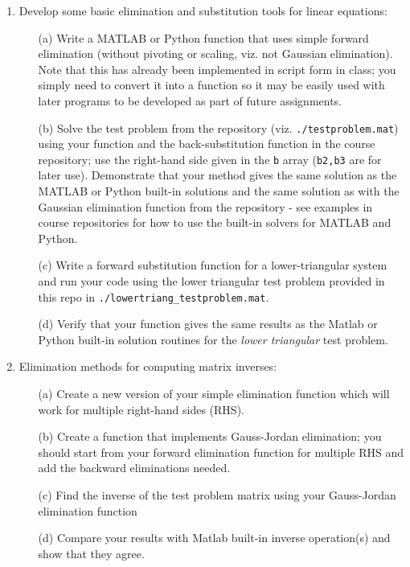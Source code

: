 \documentclass{article}
\begin{document}
\begin{enumerate}
  \item Develop some basic elimination and substitution tools for linear equations:   
  \begin{itemize}
    \item[(a)] Write a MATLAB or Python function that uses simple forward elimination (without pivoting or scaling, viz. not Gaussian elimination).  Note that this has already been implemented in script form in class; you simply need to convert it into a function so it may be easily used with later programs to be developed as part of future assignments.  
    \item[(b)] Solve the test problem from the repository (viz. \texttt{./testproblem.mat}) using your function and the back-substitution function in the course repository; use the right-hand side given in the \texttt{b} array (\texttt{b2,b3} are for later use).   Demonstrate that your method gives the same solution as the MATLAB or Python built-in solutions and the same solution as with the Gaussian elimination function from the repository - see examples in course repositories for how to use the built-in solvers for MATLAB and Python. 
    \item[(c)] Write a forward substitution function for a lower-triangular system and run your code using the lower triangular test problem provided in this repo in \texttt{./lowertriang\_testproblem.mat}.  
    \item[(d)] Verify that your function gives the same results as the Matlab or Python built-in solution routines for the \emph{lower triangular} test problem.  
  \end{itemize}
  
  \item Elimination methods for computing matrix inverses:  
  \begin{itemize}
    \item[(a)] Create a new version of your simple elimination function which will work for multiple right-hand sides (RHS).  
    \item[(b)] Create a function that implements Gauss-Jordan elimination; you should start from your forward elimination function for multiple RHS and add the backward eliminations needed.  
    \item[(c)] Find the inverse of the test problem matrix using your Gauss-Jordan elimination function
    \item[(d)] Compare your results with Matlab built-in inverse operation(s) and show that they agree.
  \end{itemize}


\end{enumerate}
\end{document}

